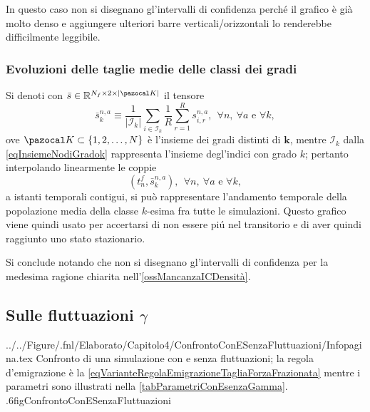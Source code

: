         \begin{oss}
          \label{ossMancanzaICDensità}
          In questo caso non si disegnano gl'intervalli di confidenza perché il grafico è già molto denso e aggiungere ulteriori barre verticali/orizzontali lo renderebbe difficilmente leggibile.
        \end{oss}
    
      \subsubsection{Evoluzioni delle taglie medie delle classi dei gradi}

        Si denoti con \(\bar s\in\mathbb R^{N_f\times2\times\vert\pazocal K\vert}\) il tensore
        \begin{equation*}
          \bar s^{n,a}_k\equiv
          \frac1{\vert\mathcal I_k\vert}\sum_{i\in\mathcal I_k}
          \frac1R\sum_{r=1}^Rs^{n,a}_{i,r},
          \ \ \forall n,\ \forall a\text{ e }\forall k,
        \end{equation*}
        ove \(\pazocal K\subset\{1,2,\ldots,N\}\) è l'insieme dei gradi distinti di \(\mathbf k\), mentre \(\mathcal I_k\) dalla \cref{eqInsiemeNodiGradok} rappresenta l'insieme degl'indici con grado \(k\); pertanto interpolando linearmente le coppie
        \begin{equation*}
          \left(t^f_n,\bar s^{n,a}_k\right),
          \ \ \forall n,\ \forall a\text{ e }\forall k,
        \end{equation*}
        a istanti temporali contigui, si può rappresentare l'andamento temporale della popolazione media della classe \(k\)-esima fra tutte le simulazioni. Questo grafico viene quindi usato per accertarsi di non essere piú nel transitorio e di aver quindi raggiunto uno stato stazionario.
        
        Si conclude notando che non si disegnano gl'intervalli di confidenza per la medesima ragione chiarita nell'\cref{ossMancanzaICDensità}.
    
    \subsection{Sulle fluttuazioni \texorpdfstring{\(\gamma\)}{γ}}

        {../../Figure/.fnl/Elaborato/Capitolo4/ConfrontoConESenzaFluttuazioni/Infopagina.tex}
        {Confronto di una simulazione con e senza fluttuazioni; la regola d'emigrazione è la \cref{eqVarianteRegolaEmigrazioneTagliaForzaFrazionata} mentre i parametri sono illustrati nella \cref{tabParametriConEsenzaGamma}.}
        {.6\linewidth}{figConfrontoConESenzaFluttuazioni}

